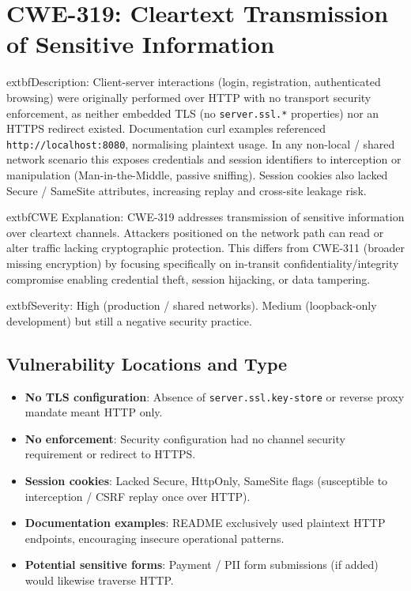 \documentclass[]{UCD_CS_FYP_Report}
\begin{document}
\section{CWE-319: Cleartext Transmission of Sensitive Information}

	extbf{Description}: Client-server interactions (login, registration, authenticated browsing) were originally performed over HTTP with no transport security enforcement, as neither embedded TLS (no \texttt{server.ssl.*} properties) nor an HTTPS redirect existed. Documentation curl examples referenced \texttt{http://localhost:8080}, normalising plaintext usage. In any non-local / shared network scenario this exposes credentials and session identifiers to interception or manipulation (Man-in-the-Middle, passive sniffing). Session cookies also lacked Secure / SameSite attributes, increasing replay and cross-site leakage risk.

	extbf{CWE Explanation}: CWE-319 addresses transmission of sensitive information over cleartext channels. Attackers positioned on the network path can read or alter traffic lacking cryptographic protection. This differs from CWE-311 (broader missing encryption) by focusing specifically on in-transit confidentiality/integrity compromise enabling credential theft, session hijacking, or data tampering.

	extbf{Severity}: High (production / shared networks). Medium (loopback-only development) but still a negative security practice.

\subsection*{Vulnerability Locations and Type}
\begin{itemize}
	\item \textbf{No TLS configuration}: Absence of \texttt{server.ssl.key-store} or reverse proxy mandate meant HTTP only.
	\item \textbf{No enforcement}: Security configuration had no channel security requirement or redirect to HTTPS.
	\item \textbf{Session cookies}: Lacked Secure, HttpOnly, SameSite flags (susceptible to interception / CSRF replay once over HTTP).
	\item \textbf{Documentation examples}: README exclusively used plaintext HTTP endpoints, encouraging insecure operational patterns.
	\item \textbf{Potential sensitive forms}: Payment / PII form submissions (if added) would likewise traverse HTTP.
\end{itemize}
\end{document}
